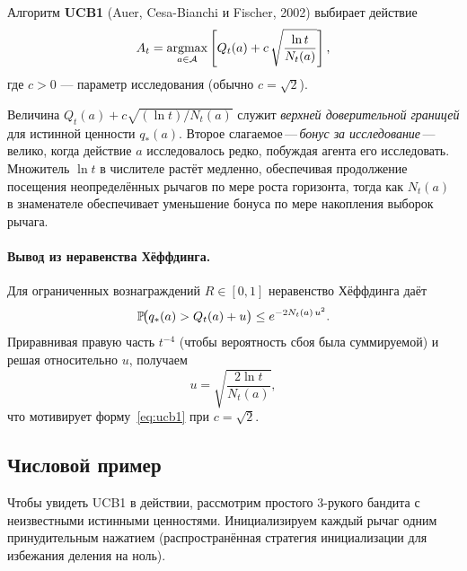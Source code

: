\begin{definition}[UCB1]
\label{def:ucb1}
Алгоритм \textbf{UCB1} (Auer, Cesa-Bianchi и Fischer, 2002) выбирает действие
\begin{equation}
\label{eq:ucb1}
A_t = \operatorname*{argmax}_{a\in\mathcal{A}}\left[Q_t(a) + c\,\sqrt{\frac{\ln t}{N_t(a)}}\right],
\end{equation}
где $c>0$ — параметр исследования (обычно $c=\sqrt{2}$).
\end{definition}

Величина $Q_t(a)+c\sqrt{(\ln t)/N_t(a)}$ служит \emph{верхней доверительной границей} для истинной ценности $q_*(a)$.  Второе слагаемое\,---\,\emph{бонус за исследование}\,---\,велико, когда действие $a$ исследовалось редко, побуждая агента его исследовать.  Множитель $\ln t$ в числителе растёт медленно, обеспечивая продолжение посещения неопределённых рычагов по мере роста горизонта, тогда как $N_t(a)$ в знаменателе обеспечивает уменьшение бонуса по мере накопления выборок рычага.

\paragraph{Вывод из неравенства Хёффдинга.}
Для ограниченных вознаграждений $R\in[0,1]$ неравенство Хёффдинга даёт
\[
\mathbb{P}\!\big(q_*(a) > Q_t(a) + u\big) \le e^{-2N_t(a)\,u^2}.
\]
Приравнивая правую часть $t^{-4}$ (чтобы вероятность сбоя была суммируемой) и решая относительно $u$, получаем
\[
u = \sqrt{\frac{2\ln t}{N_t(a)}},
\]
что мотивирует форму~\eqref{eq:ucb1} при $c=\sqrt{2}$.

\subsection*{Числовой пример}

Чтобы увидеть UCB1 в действии, рассмотрим простого $3$-рукого бандита с неизвестными истинными ценностями.  Инициализируем каждый рычаг одним принудительным нажатием (распространённая стратегия инициализации для избежания деления на ноль).

